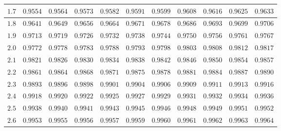 \begin{customTableWrapper}{1.3}
\begin{longtable}{|l|l|l|l|l|l|l|l|l|l|l|}
    $\mathbf{1.7}$  & ${0.9554}$   & ${0.9564}$   & ${0.9573}$   & ${0.9582}$   & ${0.9591}$   & ${0.9599}$   & ${0.9608}$   & ${0.9616}$   & ${0.9625}$   & ${0.9633}$   \\ \hline
    
    $\mathbf{1.8}$  & ${0.9641}$   & ${0.9649}$   & ${0.9656}$   & ${0.9664}$   & ${0.9671}$   & ${0.9678}$   & ${0.9686}$   & ${0.9693}$   & ${0.9699}$   & ${0.9706}$   \\ \hline
    
    $\mathbf{1.9}$  & ${0.9713}$   & ${0.9719}$   & ${0.9726}$   & ${0.9732}$   & ${0.9738}$   & ${0.9744}$   & ${0.9750}$   & ${0.9756}$   & ${0.9761}$   & ${0.9767}$   \\ \hline
    
    $\mathbf{2.0}$  & ${0.9772}$   & ${0.9778}$   & ${0.9783}$   & ${0.9788}$   & ${0.9793}$   & ${0.9798}$   & ${0.9803}$   & ${0.9808}$   & ${0.9812}$   & ${0.9817}$   \\ \hline
    
    $\mathbf{2.1}$  & ${0.9821}$   & ${0.9826}$   & ${0.9830}$   & ${0.9834}$   & ${0.9838}$   & ${0.9842}$   & ${0.9846}$   & ${0.9850}$   & ${0.9854}$   & ${0.9857}$   \\ \hline
    
    $\mathbf{2.2}$  & ${0.9861}$   & ${0.9864}$   & ${0.9868}$   & ${0.9871}$   & ${0.9875}$   & ${0.9878}$   & ${0.9881}$   & ${0.9884}$   & ${0.9887}$   & ${0.9890}$   \\ \hline
    
    $\mathbf{2.3}$  & ${0.9893}$   & ${0.9896}$   & ${0.9898}$   & ${0.9901}$   & ${0.9904}$   & ${0.9906}$   & ${0.9909}$   & ${0.9911}$   & ${0.9913}$   & ${0.9916}$   \\ \hline
    
    $\mathbf{2.4}$  & ${0.9918}$   & ${0.9920}$   & ${0.9922}$   & ${0.9925}$   & ${0.9927}$   & ${0.9929}$   & ${0.9931}$   & ${0.9932}$   & ${0.9934}$   & ${0.9936}$   \\ \hline
    
    $\mathbf{2.5}$  & ${0.9938}$   & ${0.9940}$   & ${0.9941}$   & ${0.9943}$   & ${0.9945}$   & ${0.9946}$   & ${0.9948}$   & ${0.9949}$   & ${0.9951}$   & ${0.9952}$   \\ \hline
    
    $\mathbf{2.6}$  & ${0.9953}$   & ${0.9955}$   & ${0.9956}$   & ${0.9957}$   & ${0.9959}$   & ${0.9960}$   & ${0.9961}$   & ${0.9962}$   & ${0.9963}$   & ${0.9964}$   \\ \hline
    

\end{longtable}
\end{customTableWrapper}
